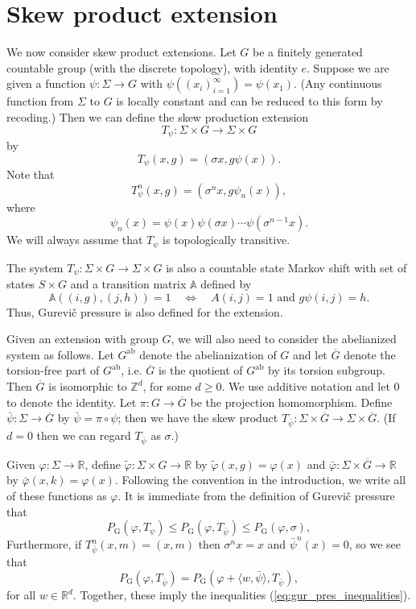 \documentclass[11pt,letterpaper]{amsart}
\theoremstyle{definition}
\numberwithin{equation}{section}
\numberwithin{theorem}{section}
\def\Z{\mathbb{Z}}
\def\R{\mathbb{R}}
\def\vp{\varphi}
\def\R{\mathbb R}
\def\Z{\mathbb Z}
\def\PG{P_{\mathrm{G}}}
\def\oG{\overline{G}}
\begin{document}
\section{Skew product extension}\label{sec:skew_prod_ext}
We now consider skew product extensions.
Let $G$ be a finitely generated countable group (with the discrete topology), with identity $e$.
Suppose we are given a function $\psi : \Sigma \to G$ with $\psi((x_i)_{i=1}^\infty) = \psi(x_1)$.
(Any continuous function from $\Sigma$ to $G$ is locally constant and can be reduced to this form
by recoding.)
Then we can define the skew production extension
\[
T_\psi : \Sigma \times G \to \Sigma \times G
\]
by
\[
T_\psi(x,g) = (\sigma x,g\psi(x)).
\]
Note that
\[
T_\psi^n(x,g) = (\sigma^nx,g\psi_n(x)),
\]
where
\[
\psi_n(x) = \psi(x) \psi(\sigma x) \cdots \psi(\sigma^{n-1}x).
\]
We will always assume that $T_\psi$ is topologically transitive.

The system
$T_\psi : \Sigma \times G \to \Sigma \times G$ is also a countable state Markov shift with set of states
$S \times G$ and a transition matrix $\mathbb A$ defined by
\[
\mathbb A((i,g),(j,h))=1
\quad
\iff
\quad 
A(i,j)=1 \mbox{ and }  g\psi(i,j)=h.
\]
Thus, Gurevi\v{c} pressure is also defined for the extension.


Given an extension with group $G$, we will also need to consider the abelianized system
as follows.
Let $G^{\mathrm{ab}}$ denote the abelianization of $G$ and let $\overline G$ denote the torsion-free part of $G^{\mathrm{ab}}$, i.e. $\oG$ is the quotient of $G^{\mathrm{ab}}$ by its torsion subgroup.
Then $\oG$ is isomorphic to $\Z^d$, for some $d \ge 0$.
We use additive notation and let
$0$ to denote the identity.
Let $\pi :G \to \oG$ be the projection homomorphism.
Define $\bar \psi : \Sigma \to \oG$ by $\bar \psi = \pi \circ \psi$;
then we have the skew product $T_{\bar \psi} : \Sigma \times \oG \to \Sigma \times \oG$.
(If $d=0$ then we can regard $T_{\bar \psi}$ as $\sigma$.)

Given $\vp : \Sigma \to \R$, define $\tilde \vp : \Sigma \times G \to \R$ by
$\tilde \vp(x,g) = \vp(x)$ and 
$\bar \vp : \Sigma \times \overline{G} \to \R$ by 
$\bar \vp(x,k) = \vp(x)$. Following the convention in the introduction, 
we write all of these functions as $\vp$.
It is immediate from the definition of Gurevi\v{c} pressure that
\[
\PG(\vp,T_\psi) \le \PG(\vp,T_{\bar \psi}) \le \PG(\vp ,\sigma),
\]
Furthermore, if $T_{\bar \psi}^n(x,m)=(x,m)$ then $\sigma^nx=x$ and $\bar \psi^n(x)=0$, so we see that 
\[
\PG(\vp,T_{\bar \psi}) = \PG(\vp + \langle w,\bar \psi \rangle,T_{\bar \psi}),
\]
for all $w \in \R^d$. Together, these imply the inequalities (\ref{eq:gur_pres_inequalities}).
\end{document}

